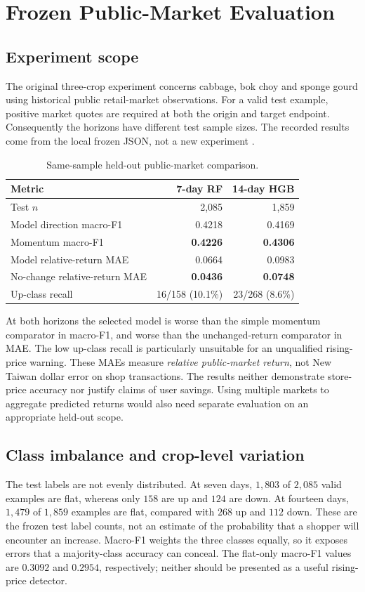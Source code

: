 \documentclass[conference]{IEEEtran}
\begin{document}
\section{Frozen Public-Market Evaluation}
\subsection{Experiment scope}
The original three-crop experiment concerns cabbage, bok choy and sponge gourd using historical public retail-market observations. For a valid test example, positive market quotes are required at both the origin and target endpoint. Consequently the horizons have different test sample sizes. The recorded results come from the local frozen JSON, not a new experiment \cite{fmpafrozen}.

\begin{table}[ht]
\centering
\caption{Same-sample held-out public-market comparison.}
\label{tab:results}
\small
\begin{tabularx}{\columnwidth}{@{}>{\raggedright\arraybackslash}Xrr@{}}
\toprule
Metric & 7-day RF & 14-day HGB\\
\midrule
Test $n$ & 2,085 & 1,859\\
Model direction macro-F1 & 0.4218 & 0.4169\\
Momentum macro-F1 & \textbf{0.4226} & \textbf{0.4306}\\
Model relative-return MAE & 0.0664 & 0.0983\\
No-change relative-return MAE & \textbf{0.0436} & \textbf{0.0748}\\
Up-class recall & 16/158 (10.1\%) & 23/268 (8.6\%)\\
\bottomrule
\end{tabularx}
\end{table}

At both horizons the selected model is worse than the simple momentum comparator in macro-F1, and worse than the unchanged-return comparator in MAE. The low up-class recall is particularly unsuitable for an unqualified rising-price warning. These MAEs measure \emph{relative public-market return}, not New Taiwan dollar error on shop transactions. The results neither demonstrate store-price accuracy nor justify claims of user savings. Using multiple markets to aggregate predicted returns would also need separate evaluation on an appropriate held-out scope.

\subsection{Class imbalance and crop-level variation}
The test labels are not evenly distributed. At seven days, $1{,}803$ of $2{,}085$ valid examples are flat, whereas only $158$ are up and $124$ are down. At fourteen days, $1{,}479$ of $1{,}859$ examples are flat, compared with $268$ up and $112$ down. These are the frozen test label counts, not an estimate of the probability that a shopper will encounter an increase. Macro-F1 weights the three classes equally, so it exposes errors that a majority-class accuracy can conceal. The flat-only macro-F1 values are $0.3092$ and $0.2954$, respectively; neither should be presented as a useful rising-price detector.
\end{document}
